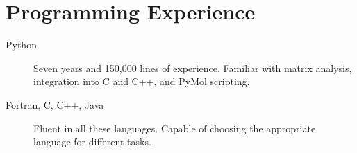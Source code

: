 \documentclass{article}
\begin{document}
 \section*{Programming Experience}

  \begin{description}
   \item[Python] Seven years and 150,000 lines of experience.  Familiar with
   matrix analysis, integration into C and C++, and PyMol scripting.

   \item[Fortran, C, C++, Java] Fluent in all these languages.  Capable of 
   choosing the appropriate language for different tasks.
   \end{description}
\end{document}
